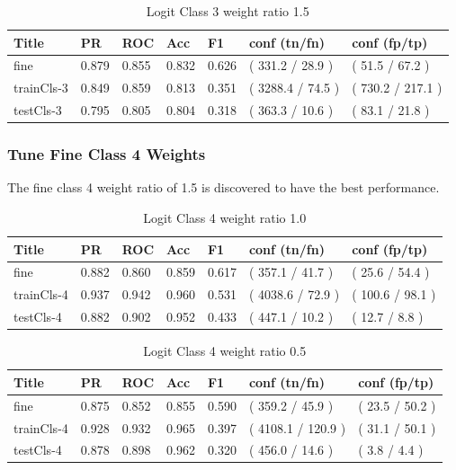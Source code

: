 \documentclass[ms]{nuthesis}
\begin{document}
\FloatBarrier
\begin{table}[H]
\centering
\caption{Logit Class 3 weight ratio 1.5}
\label{tab:LogRegCls3-Wt1p5}
\begin{tabular}{|l||l||l||l||l||l||l|}\toprule
Title & PR & ROC & Acc & F1 & conf (tn/fn) & conf (fp/tp) \\ \midrule
fine & 0.879 & 0.855 & 0.832 & 0.626 & ( 331.2 / 28.9 ) & ( 51.5 / 67.2 ) \\
trainCls-3 & 0.849 & 0.859 & 0.813 & 0.351 & ( 3288.4 / 74.5 ) & ( 730.2 / 217.1 ) \\
testCls-3 & 0.795 & 0.805 & 0.804 & 0.318 & ( 363.3 / 10.6 ) & ( 83.1 / 21.8 ) \\ \bottomrule
\end{tabular}
\end{table}
\FloatBarrier


\subsubsection{Tune Fine Class 4 Weights}
\par The fine class 4 weight ratio of 1.5 is discovered to have the best performance.
\FloatBarrier
\begin{table}[H]
\centering
\caption{Logit Class 4 weight ratio 1.0}
\label{tab:LogRegCls4-Wt1}
\begin{tabular}{|l||l||l||l||l||l||l|}\toprule
Title & PR & ROC & Acc & F1 & conf (tn/fn) & conf (fp/tp) \\ \midrule
fine & 0.882 & 0.860 & 0.859 & 0.617 & ( 357.1 / 41.7 ) & ( 25.6 / 54.4 ) \\
trainCls-4 & 0.937 & 0.942 & 0.960 & 0.531 & ( 4038.6 / 72.9 ) & ( 100.6 / 98.1 ) \\
testCls-4 & 0.882 & 0.902 & 0.952 & 0.433 & ( 447.1 / 10.2 ) & ( 12.7 / 8.8 ) \\ \bottomrule
\end{tabular}
\end{table}
\FloatBarrier

\FloatBarrier
\begin{table}[H]
\centering
\caption{Logit Class 4 weight ratio 0.5}
\label{tab:LogRegCls4-Wtp5}
\begin{tabular}{|l||l||l||l||l||l||l|}\toprule
Title & PR & ROC & Acc & F1 & conf (tn/fn) & conf (fp/tp) \\ \midrule
fine & 0.875 & 0.852 & 0.855 & 0.590 & ( 359.2 / 45.9 ) & ( 23.5 / 50.2 ) \\
trainCls-4 & 0.928 & 0.932 & 0.965 & 0.397 & ( 4108.1 / 120.9 ) & ( 31.1 / 50.1 ) \\
testCls-4 & 0.878 & 0.898 & 0.962 & 0.320 & ( 456.0 / 14.6 ) & ( 3.8 / 4.4 ) \\ \bottomrule
\end{tabular}
\end{table}
\FloatBarrier
\end{document}
